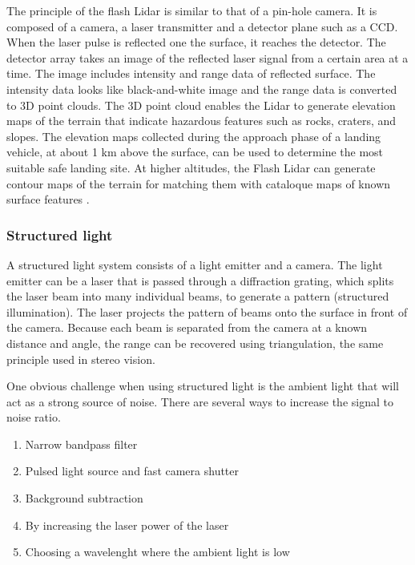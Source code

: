 The principle of the flash Lidar is similar to that of a pin-hole camera. It is composed of a camera, a laser transmitter and a detector plane such as a CCD. When the laser pulse is reflected one the surface, it reaches the detector. The detector array takes an image of the reflected laser signal from a certain area at a time. The image includes intensity and range data of reflected surface. The intensity data looks like black-and-white image and the range data is converted to 3D point clouds.
The 3D point cloud enables the Lidar to generate elevation maps of the terrain that indicate hazardous features such as rocks, craters, and slopes. The elevation maps collected during the approach phase of a landing vehicle, at about 1 km above the surface, can be used to determine the most suitable safe landing site. At higher altitudes, the Flash Lidar can generate contour maps of the terrain for matching them with cataloque maps of known surface features \cite{alhat}.

\subsubsection{Structured light}


A structured light system consists of a light emitter and a camera. The light emitter can be a laser that is passed through a diffraction grating, which splits the laser beam into many individual beams, to generate a pattern (structured illumination). The laser projects the pattern of beams onto the surface in front of the camera. Because each beam is separated from the camera at a known distance and angle, the range can be recovered using triangulation, the same principle used in stereo vision.  \cite{structuredlight}

One obvious challenge when using structured light is the ambient light that will act as a strong source of noise. There are several ways to increase the signal to noise ratio. 

\begin{enumerate}

\item Narrow bandpass filter
\item Pulsed light source and fast camera shutter
\item Background subtraction
\item By increasing the laser power of the laser
\item Choosing a wavelenght where the ambient light is low

\end{enumerate}


